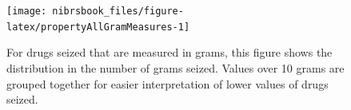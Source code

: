 \documentclass[
  12pt,
  openany]{book}
\begin{document}
\begin{figure}

{\centering \texttt{[image: nibrsbook\_files/figure-latex/propertyAllGramMeasures-1]} 

}

\caption{For drugs seized that are measured in grams, this figure shows the distribution in the number of grams seized. Values over 10 grams are grouped together for easier interpretation of lower values of drugs seized.}\label{fig:propertyAllGramMeasures}
\end{figure}

  
\end{document}
